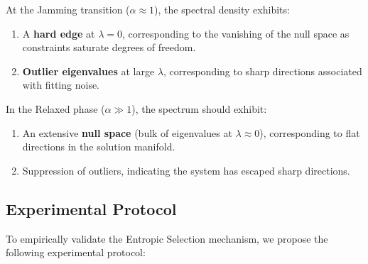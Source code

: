 \begin{hypothesis}
At the Jamming transition ($\alpha \approx 1$), the spectral density exhibits:
\begin{enumerate}[topsep=1pt,itemsep=1pt]
    \item A \textbf{hard edge} at $\lambda = 0$, corresponding to the vanishing of the null space as constraints saturate degrees of freedom.
    \item \textbf{Outlier eigenvalues} at large $\lambda$, corresponding to sharp directions associated with fitting noise.
\end{enumerate}
In the Relaxed phase ($\alpha \gg 1$), the spectrum should exhibit:
\begin{enumerate}[topsep=1pt,itemsep=1pt]
    \item An extensive \textbf{null space} (bulk of eigenvalues at $\lambda \approx 0$), corresponding to flat directions in the solution manifold.
    \item Suppression of outliers, indicating the system has escaped sharp directions.
\end{enumerate}
\end{hypothesis}

\subsection{Experimental Protocol}

To empirically validate the Entropic Selection mechanism, we propose the following experimental protocol:

\begin{algorithm}[htb]
\renewcommand{\algorithmcfname}{Experimental Protocol}
\caption{NESP Validation via Teacher-Student Model}
\end{algorithm}

